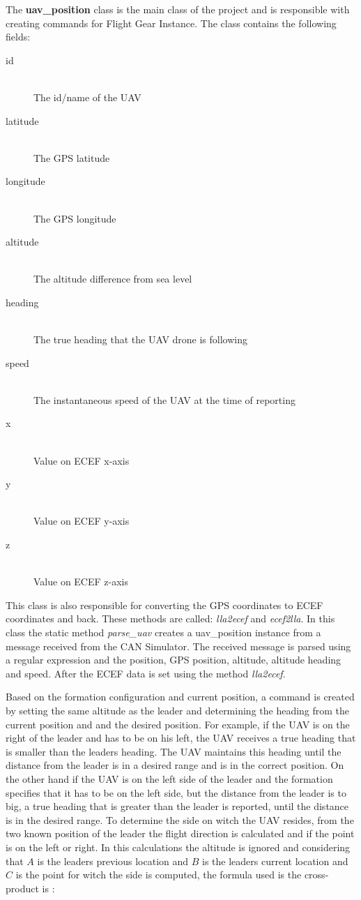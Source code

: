 The \textbf{uav_position} class is the main class of the project and is
responsible with creating commands for Flight Gear Instance. The class
contains the following fields:

\begin{description}
\item [id] \hfill \\ The id/name of the UAV
\item [latitude] \hfill \\ The GPS latitude
\item [longitude] \hfill \\ The GPS longitude
\item [altitude] \hfill \\ The altitude difference from sea level
\item [heading] \hfill \\ The true heading that the UAV drone is following
\item [speed] \hfill \\ The instantaneous speed of the UAV at the time of reporting
\item [x] \hfill \\ Value on ECEF x-axis
\item [y] \hfill \\ Value on ECEF y-axis
\item [z] \hfill \\ Value on ECEF z-axis
\end{description}
% 
This class is also responsible for converting the GPS coordinates to ECEF coordinates
and back. These methods are called: \textit{lla2ecef} and \textit{ecef2lla}. In 
this class the static method \textit{parse_uav} creates a uav_position instance
from a message received from the CAN Simulator. The received message
is parsed using a regular expression and the position, GPS position,  altitude, 
altitude heading and speed. After the ECEF data is set using the method 
\textit{lla2ecef}.
 
Based on the formation configuration and current position, a command is created 
by setting the same altitude as the leader and determining the heading 
from the current position and and the desired position. For example, if the UAV
is on the right of the leader and has to be on his left, the UAV receives a
true heading that is smaller than the leaders heading. The UAV maintains this heading
until the distance from the leader is in a desired range and is in the correct
position. On the other hand if the UAV is on the left side of the leader and
the formation specifies that it has to be on the left side, but the distance
from the leader is to big, a true heading that is greater than the leader is 
reported, until the distance is in the desired range. To determine the side on
witch the UAV resides,  from the two known position of the leader 
the flight direction is calculated and if the point is on the left or right.
In this calculations the altitude is ignored and considering that $A$ is the 
leaders previous location and $B$ is the leaders current location and $C$
is the point for witch the side is computed, the formula used is the 
cross-product is :

